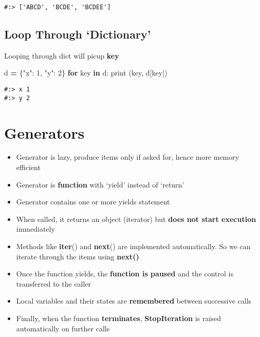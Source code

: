 \documentclass[
]{book}
\newenvironment{Shaded}{\begin{snugshade}}{\end{snugshade}}
\newcommand{\BuiltInTok}[1]{#1}
\newcommand{\ControlFlowTok}[1]{\textcolor[rgb]{0.27,0.27,0.27}{\textbf{#1}}}
\newcommand{\DecValTok}[1]{\textcolor[rgb]{0.06,0.06,0.06}{#1}}
\newcommand{\KeywordTok}[1]{\textcolor[rgb]{0.27,0.27,0.27}{\textbf{#1}}}
\newcommand{\NormalTok}[1]{#1}
\newcommand{\OperatorTok}[1]{\textcolor[rgb]{0.43,0.43,0.43}{\textbf{#1}}}
\newcommand{\StringTok}[1]{\textcolor[rgb]{0.5,0.5,0.5}{#1}}
\providecommand{\tightlist}{%
  \setlength{\itemsep}{0pt}\setlength{\parskip}{0pt}}
\begin{document}
\begin{verbatim}
#:> ['ABCD', 'BCDE', 'BCDEE']
\end{verbatim}

\hypertarget{loop-through-dictionary}{%
\subsection{Loop Through `Dictionary'}\label{loop-through-dictionary}}

Looping through dict will picup \textbf{key}

\begin{Shaded}
\begin{Highlighting}[]
\NormalTok{d }\OperatorTok{=}\NormalTok{ \{}\StringTok{"x"}\NormalTok{: }\DecValTok{1}\NormalTok{, }\StringTok{"y"}\NormalTok{: }\DecValTok{2}\NormalTok{\}}
\ControlFlowTok{for}\NormalTok{ key }\KeywordTok{in}\NormalTok{ d:}
    \BuiltInTok{print}\NormalTok{ (key, d[key])}
\end{Highlighting}
\end{Shaded}

\begin{verbatim}
#:> x 1
#:> y 2
\end{verbatim}

\hypertarget{generators}{%
\section{Generators}\label{generators}}

\begin{itemize}
\tightlist
\item
  Generator is lazy, produce items only if asked for, hence more memory efficient
\item
  Generator is \textbf{function} with `yield' instead of `return'\\
\item
  Generator contains one or more yields statement\\
\item
  When called, it returns an object (iterator) but \textbf{does not start execution} immediately\\
\item
  Methods like \textbf{iter}() and \textbf{next}() are implemented automatically. So we can iterate through the items using \textbf{next()}\\
\item
  Once the function yields, the \textbf{function is paused} and the control is transferred to the caller\\
\item
  Local variables and their states are \textbf{remembered} between successive calls\\
\item
  Finally, when the function \textbf{terminates}, \textbf{StopIteration} is raised automatically on further calls
\end{itemize}
\end{document}
